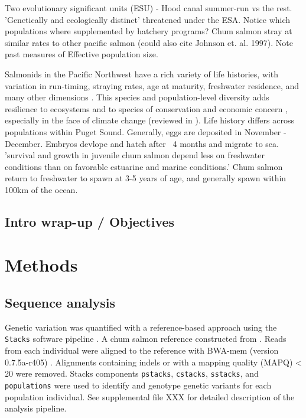 \documentclass[12pt, one column]{article}
\begin{document}
Two evolutionary significant units (ESU) - Hood canal summer-run vs the rest. 'Genetically and ecologically distinct' threatened under the ESA. Notice which populations where supplemented by hatchery programs?
Chum salmon stray at similar rates to other pacific salmon \cite{Small2014} (could also cite Johnson et. al. 1997).  Note past measures of Effective population size.

Salmonids in the Pacific Northwest have a rich variety of life histories, with variation in run-timing, straying rates, age at maturity, freshwater residence, and many other dimensions \citep{Quinn2005}. This species and population-level diversity adds resilience to ecosystems and to species of conservation and economic concern \citep{Schindler2010}, especially in the face of climate change (reviewed in \citet{Schindler2015}).  Life history differs across populations within Puget Sound.  Generally, eggs are deposited in November - December. Embryos devlope and hatch after ~4 months and migrate to sea. 'survival and growth in juvenile chum salmon depend less on freshwater conditions than on favorable estuarine and marine conditions.'  Chum salmon return to freshwater to spawn at 3-5 years of age, and generally spawn within 100km of the ocean.

\subsection*{Intro wrap-up / Objectives}

\section*{Methods}

\subsection*{Sequence analysis}
Genetic variation was quantified with a reference-based approach using the \texttt{Stacks} software pipeline \citep{Catchen2013}.  A chum salmon reference constructed from \citep{Waples2015}. Reads from each individual were aligned to the reference with BWA-mem  (version 0.7.5a-r405) \citep{Li2013}.  Alignments containing indels or with a mapping quality (MAPQ) < 20 were removed. Stacks components \texttt{pstacks}, \texttt{cstacks}, \texttt{sstacks}, and \texttt{populations} were used to identify and genotype genetic variants for each population individual.  See supplemental file XXX for detailed description of the analysis pipeline.
\end{document}
